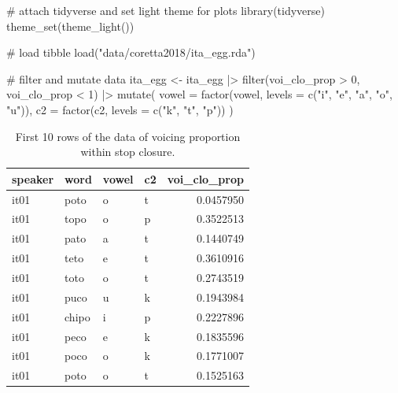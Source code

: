 \documentclass[
  authoryear,
  preprint,
  3p]{elsarticle}
\newenvironment{Shaded}{\begin{snugshade}}{\end{snugshade}}
\newcommand{\AttributeTok}[1]{\textcolor[rgb]{0.40,0.45,0.13}{#1}}
\newcommand{\CommentTok}[1]{\textcolor[rgb]{0.37,0.37,0.37}{#1}}
\newcommand{\DecValTok}[1]{\textcolor[rgb]{0.68,0.00,0.00}{#1}}
\newcommand{\FunctionTok}[1]{\textcolor[rgb]{0.28,0.35,0.67}{#1}}
\newcommand{\NormalTok}[1]{\textcolor[rgb]{0.00,0.23,0.31}{#1}}
\newcommand{\OtherTok}[1]{\textcolor[rgb]{0.00,0.23,0.31}{#1}}
\newcommand{\SpecialCharTok}[1]{\textcolor[rgb]{0.37,0.37,0.37}{#1}}
\newcommand{\StringTok}[1]{\textcolor[rgb]{0.13,0.47,0.30}{#1}}
\begin{document}
\begin{Shaded}
\begin{Highlighting}[]
\CommentTok{\# attach tidyverse and set light theme for plots}
\FunctionTok{library}\NormalTok{(tidyverse)}
\FunctionTok{theme\_set}\NormalTok{(}\FunctionTok{theme\_light}\NormalTok{())}

\CommentTok{\# load tibble}
\FunctionTok{load}\NormalTok{(}\StringTok{"data/coretta2018/ita\_egg.rda"}\NormalTok{)}

\CommentTok{\# filter and mutate data}
\NormalTok{ita\_egg }\OtherTok{\textless{}{-}}\NormalTok{ ita\_egg }\SpecialCharTok{|\textgreater{}} 
  \FunctionTok{filter}\NormalTok{(voi\_clo\_prop }\SpecialCharTok{\textgreater{}} \DecValTok{0}\NormalTok{, voi\_clo\_prop }\SpecialCharTok{\textless{}} \DecValTok{1}\NormalTok{) }\SpecialCharTok{|\textgreater{}} 
  \FunctionTok{mutate}\NormalTok{(}
    \AttributeTok{vowel =} \FunctionTok{factor}\NormalTok{(vowel, }\AttributeTok{levels =} \FunctionTok{c}\NormalTok{(}\StringTok{"i"}\NormalTok{, }\StringTok{"e"}\NormalTok{, }\StringTok{"a"}\NormalTok{, }\StringTok{"o"}\NormalTok{, }\StringTok{"u"}\NormalTok{)),}
    \AttributeTok{c2 =} \FunctionTok{factor}\NormalTok{(c2, }\AttributeTok{levels =} \FunctionTok{c}\NormalTok{(}\StringTok{"k"}\NormalTok{, }\StringTok{"t"}\NormalTok{, }\StringTok{"p"}\NormalTok{))}
\NormalTok{  )}
\end{Highlighting}
\end{Shaded}

\begin{longtable}[]{@{}llllr@{}}

\caption{\label{tbl-ita-egg}First 10 rows of the data of voicing
proportion within stop closure.}

\tabularnewline

\toprule\noalign{}
speaker & word & vowel & c2 & voi\_clo\_prop \\
\midrule\noalign{}
\endhead
\bottomrule\noalign{}
\endlastfoot
it01 & poto & o & t & 0.0457950 \\
it01 & topo & o & p & 0.3522513 \\
it01 & pato & a & t & 0.1440749 \\
it01 & teto & e & t & 0.3610916 \\
it01 & toto & o & t & 0.2743519 \\
it01 & puco & u & k & 0.1943984 \\
it01 & chipo & i & p & 0.2227896 \\
it01 & peco & e & k & 0.1835596 \\
it01 & poco & o & k & 0.1771007 \\
it01 & poto & o & t & 0.1525163 \\

\end{longtable}
\end{document}
